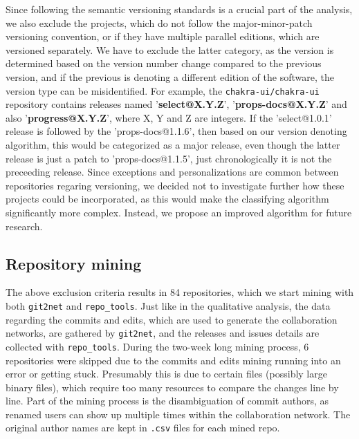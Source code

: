Since following the semantic versioning standards is a crucial part of the analysis, we also exclude the projects, which do not follow the major-minor-patch versioning convention, or if they have multiple parallel editions, which are versioned separately. We have to exclude the latter category, as the version is determined based on the version number change compared to the previous version, and if the previous is denoting a different edition of the software, the version type can be misidentified. For example, the \texttt{chakra-ui/chakra-ui} repository contains releases named '\textbf{select@X.Y.Z}', '\textbf{props-docs@X.Y.Z}' and also '\textbf{progress@X.Y.Z}', where X, Y and Z are integers. If the 'select@1.0.1' release is followed by the 'props-docs@1.1.6', then based on our version denoting algorithm, this would be categorized as a major release, even though the latter release is just a patch to 'props-docs@1.1.5', just chronologically it is not the preceeding release. Since exceptions and personalizations are common between repositories regaring versioning, we decided not to investigate further how these projects could be incorporated, as this would make the classifying algorithm significantly more complex. Instead, we propose an improved algorithm for future research.

\subsection{Repository mining}

The above exclusion criteria results in 84 repositories, which we start mining with both \texttt{git2net} and \texttt{repo\_tools}. Just like in the qualitative analysis, the data regarding the commits and edits, which are used to generate the collaboration networks, are gathered by \texttt{git2net}, and the releases and issues details are collected with \texttt{repo\_tools}. During the two-week long mining process, 6 repositories were skipped due to the commits and edits mining running into an error or getting stuck. Presumably this is due to certain files (possibly large binary files), which require too many resources to compare the changes line by line. Part of the mining process is the disambiguation of commit authors, as renamed users can show up multiple times within the collaboration network. The original author names are kept in \texttt{.csv} files for each mined repo.

